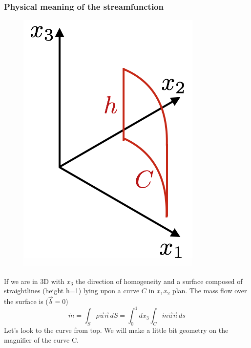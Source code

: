 		\newpage
		\subsubsection{Physical meaning of the streamfunction}
			\begin{figure}
			\vspace{-5mm}
			\includegraphics[scale=0.4]{ch1/13}
			\label{fig:1.13}
			\end{figure}
			If we are in 3D with $x_3$ the direction of homogeneity and a surface composed of straightlines (height h=1) lying upon a curve $C$ in $x_1 x_2$ plan. The mass flow over the surface is ($\vec{b} = 0$)
			\begin{equation}
				\dot{m} = \int _S \rho \vec{u}\vec{n}\, dS = \int _0 ^1 dx_3 \int _C \dot{m}\vec{u}\vec{n}\, ds
				\label{eq:108}
			\end{equation}
		Let's look to the curve from top. We will make a little bit geometry on the magnifier of the curve C. \\
		

